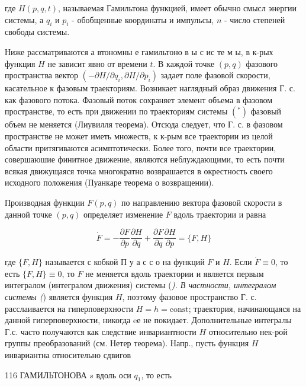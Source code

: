 \documentclass[10pt]{article}
\begin{document}
где $H(p, q, t)$, называемая Гамильтона функцией, имеет обычно смысл энергии системы, а $q_{i}$ и $p_{i}$ - обобщенные координаты и импульсы, $n$ - число степеней свободы системы.



Ниже рассматриваются а втономны е гамильтоно в ы с ис те м ы, в к-рых функция $H$ не зависит явно от времени $t$. В каждой точке $(p, q)$ фазового пространства вектор $\left(-\partial H / \partial q_{i}, \partial H / \partial p_{i}\right)$ задает поле фазовой скорости, касательное к фазовым траекториям. Возникает наглядный образ движения Г. с. как фазового потока. Фазовый поток сохраняет элемент объема в фазовом пространстве, то есть при движении по траекториям системы $\left(^{*}\right)$ фазовый объем не меняется (Лиувилля теорема). Отсюда следует, что Г. с. в фазовом пространстве не может иметь множеств, к к-рым все траектории из целой области притягиваются асимптотически. Более того, почти все траектории, совершаюшие финитное движение, являются неблуждающими, то есть почти всякая движущаяся точка многократно возврашается в окрестность своего исходного положения (Пуанкаре теорема о возвращении).



Производная функции $F(p, q)$ по направлению вектора фазовой скорости в данной точке $(p, q)$ определяет изменение $F$ вдоль траектории и равна



\[

\dot{F}=-\frac{\partial F}{\partial p} \frac{\partial H}{\partial q}+\frac{\partial F}{\partial q} \frac{\partial H}{\partial p}=\{F, H\}

\]



где $\{F, H\}$ называется с кобкой П у а с с о на функций $F$ и $H$. Если $\dot{F} \equiv 0$, то есть $\{F, H\} \equiv 0$, то $F$ не меняется вдоль траектории и является первым интегралом (интегралом движения) системы (\textit{). В частности, интегралом системы (}) является функция $H$, поэтому фазовое пространство Г. с. расслаивается на гиперповерхности $H=h=\mathrm{const}$; траектория, начинающаяся на данной гиперповерхности, никогда eе не покидает. Дополнительные интегралы Г.с. часто получаются как следствие инвариантности $H$ относительно нек-рой группы преобразований (см. Нетер теорема). Напр., пусть функция $H$ инвариантна относительно сдвигов



116 ГАМИЛЬТОНОВА $s$ вдоль оси $q_{1}$, то есть
\end{document}
